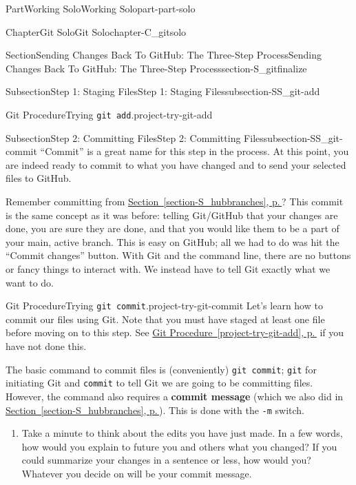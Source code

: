 \documentclass[twoside,10pt,]{book}
\newcommand{\xreffont}{\relax}
\newcommand{\mono}[1]{\texttt{#1}}
\newcommand{\terminology}[1]{\textbf{#1}}
\begin{document}
\begin{partptx}{Part}{Working Solo}{}{Working Solo}{}{}{part-part-solo}
\begin{chapterptx}{Chapter}{Git Solo}{}{Git Solo}{}{}{chapter-C_gitsolo}
\begin{sectionptx}{Section}{Sending Changes Back To GitHub: The Three-Step Process}{}{Sending Changes Back To GitHub: The Three-Step Process}{}{}{section-S_gitfinalize}
\begin{subsectionptx}{Subsection}{Step 1: Staging Files}{}{Step 1: Staging Files}{}{}{subsection-SS_git-add}
\begin{project}{Git Procedure}{Trying \mono{git add}.}{project-try-git-add}
\begin{enumerate}[font=\bfseries,label=(\alph*),ref=\alph*]
\end{enumerate}%
\end{project}%
\end{subsectionptx}
%
%
\typeout{************************************************}
\typeout{************************************************}
%
\begin{subsectionptx}{Subsection}{Step 2: Committing Files}{}{Step 2: Committing Files}{}{}{subsection-SS_git-commit}
%
%
%
%
``Commit'' is a great name for this step in the process. At this point, you are indeed ready to commit to what you have changed and to send your selected files to GitHub.%
\par
Remember committing from \hyperref[section-S_hubbranches]{Section~{\xreffont\ref{section-S_hubbranches}}, p.\,\pageref{section-S_hubbranches}}? This commit is the same concept as it was before: telling Git\slash{}GitHub that your changes are done, you are sure they are done, and that you would like them to be a part of your main, active branch. This is easy on GitHub; all we had to do was hit the ``Commit changes'' button. With Git and the command line, there are no buttons or fancy things to interact with. We instead have to tell Git exactly what we want to do.%
\begin{project}{Git Procedure}{Trying \mono{git commit}.}{project-try-git-commit}%
Let's learn how to commit our files using Git. Note that you must have staged at least one file before moving on to this step. See \hyperref[project-try-git-add]{Git Procedure~{\xreffont\ref{project-try-git-add}}, p.\,\pageref{project-try-git-add}} if you have not done this.%
\par
The basic command to commit files is (conveniently) \mono{git commit}; \mono{git} for initiating Git and \mono{commit} to tell Git we are going to be committing files. However, the command also requires a \terminology{commit message} (which we also did in \hyperref[section-S_hubbranches]{Section~{\xreffont\ref{section-S_hubbranches}}, p.\,\pageref{section-S_hubbranches}}). This is done with the \mono{-m} switch.%
\begin{enumerate}[font=\bfseries,label=(\alph*),ref=\alph*]%
\item{}Take a minute to think about the edits you have just made. In a few words, how would you explain to future you and others what you changed? If you could summarize your changes in a sentence or less, how would you? Whatever you decide on will be your commit message.%

\end{enumerate}
\end{project}
\end{subsectionptx}
\end{sectionptx}
\end{chapterptx}
\end{partptx}
\end{document}
